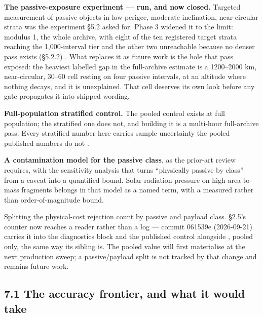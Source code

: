 \documentclass[11pt]{article}
\begin{document}
\textbf{The passive-exposure experiment --- run, and now closed.} Targeted measurement of passive objects in low-perigee, moderate-inclination, near-circular strata was the experiment \S{}5.2 asked for. Phase 3 widened it to the limit: modulus 1, the whole archive, with eight of the ten registered target strata reaching the 1,000-interval tier and the other two unreachable because no denser pass exists (\S{}5.2.2)%
. What replaces it as future work is the hole that pass exposed: the heaviest labelled gap in the full-archive estimate is a 1200--2000 km, near-circular, 30--60\textdegree{} cell resting on four passive intervals, at an altitude where nothing decays, and it is unexplained. That cell deserves its own look before any gate propagates it into shipped wording.

\textbf{Full-population stratified control.} The pooled control exists at full population; the stratified one does not, and building it is a multi-hour full-archive pass. Every stratified number here carries sample uncertainty the pooled published numbers do not%
.

\textbf{A contamination model for the passive class}, as the prior-art review requires, with the sensitivity analysis that turns ``physically passive by class'' from a caveat into a quantified bound. Solar radiation pressure on high area-to-mass fragments belongs in that model as a named term, with a measured rather than order-of-magnitude bound.

Splitting the physical-cost rejection count by passive and payload class. \S{}2.5's  counter now reaches a reader rather than a log --- commit 061539e (2026-09-21) carries it into the diagnostics block and the published control alongside , pooled only, the same way its sibling is. The pooled value will first materialise at the next production sweep; a passive/payload split is not tracked by that change and remains future work.

\subsection*{7.1 The accuracy frontier, and what it would take}
\end{document}
